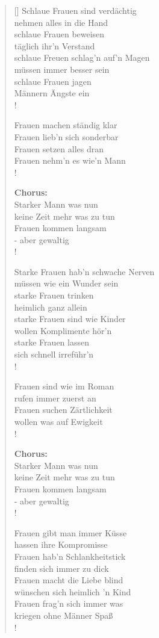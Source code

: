 \documentclass[12pt,a4paper]{scrartcl}
\begin{document}
 \begin{verse}[\versewidth]
Schlaue Frauen sind verdächtig\\
nehmen alles in die Hand\\
schlaue Frauen beweisen\\
täglich ihr'n Verstand\\
schlaue Freuen schlag'n auf'n Magen\\
müssen immer besser sein\\
schlaue Frauen jagen\\
Männern Ängste ein\\!

Frauen machen ständig klar\\
Frauen lieb'n sich sonderbar\\
Frauen setzen alles dran\\
Frauen nehm'n es wie'n Mann\\!

\textbf{Chorus:}\\
Starker Mann was nun\\
keine Zeit mehr was zu tun\\
Frauen kommen langsam\\
- aber gewaltig\\!

Starke Frauen hab'n schwache Nerven\\
müssen wie ein Wunder sein\\
starke Frauen trinken\\
heimlich ganz allein\\
starke Frauen sind wie Kinder\\
wollen Komplimente hör'n\\
starke Frauen lassen\\
sich schnell irreführ'n\\!

Frauen sind wie im Roman\\
rufen immer zuerst an\\
Frauen suchen Zärtlichkeit\\
wollen was auf Ewigkeit\\!

\textbf{Chorus:}\\
Starker Mann was nun\\
keine Zeit mehr was zu tun\\
Frauen kommen langsam\\
- aber gewaltig\\!

Frauen gibt man immer Küsse\\
hassen ihre Kompromisse\\
Frauen hab'n Schlankheitstick\\
finden sich immer zu dick\\
Frauen macht die Liebe blind\\
wünschen sich heimlich 'n Kind\\
Frauen frag'n sich immer was\\
kriegen ohne Männer Spaß\\!


\end{verse}
\end{document}
